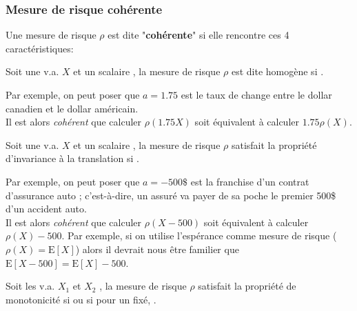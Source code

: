 \documentclass[10pt, french]{article}
\begin{document}
\begin{multicols*}{2}
\columnbreak
\subsubsection{Mesure de risque cohérente}
Une mesure de risque $\rho$ est dite "\textbf{cohérente}" si elle rencontre ces 4 caractéristiques:
\begin{definitionNOHFILLsub}[Homogénéité]
Soit une v.a. $X$ et un scalaire , la mesure de risque $\rho$ est dite homogène si .

\begin{rappel_enhanced}[Interprétation]
Par exemple, on peut poser que $a	=	1.75$ est le taux de change entre le dollar canadien et le dollar américain.\\
Il est alors \textit{cohérent} que calculer $\rho(1.75X)$ soit équivalent à calculer $1.75\rho(X)$.
\end{rappel_enhanced}
\end{definitionNOHFILLsub}

\begin{definitionNOHFILLsub}
Soit une v.a. $X$ et un scalaire , la mesure de risque $\rho$ satisfait la propriété d'invariance à la translation si .	\\

\begin{rappel_enhanced}[Interprétation]
Par exemple, on peut poser que $a	=	-500\$$ est la franchise d'un contrat d'assurance auto ; c'est-à-dire, un assuré va payer de sa poche le premier 500\$ d'un accident auto.\\

Il est alors \textit{cohérent} que calculer $\rho(X - 500)$ soit équivalent à calculer $\rho(X) - 500$. Par exemple, si on utilise l'espérance comme mesure de risque ($\rho(X)	=	\text{E}[X]$) alors  il devrait nous être familier que $\text{E}[X	-	500]	=	\text{E}[X]	-	500$.
\end{rappel_enhanced}
\end{definitionNOHFILLsub}

\begin{definitionNOHFILLsub}[Monotonicité]
Soit les v.a. $X_{1}$ et $X_{2}$ , la mesure de risque $\rho$ satisfait la propriété de monotonicité si  ou si pour un  fixé, .\\


\end{definitionNOHFILLsub}
\end{multicols*}
\end{document}
